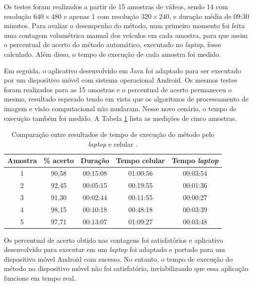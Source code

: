 Os testes foram realizados a partir de 15 amostras de vídeos, sendo 14 com resolução $640\times 480$ e apenas 1 com resolução $320\times 240$, e duração média de 09:30 minutos. Para avaliar o desempenho do método, num primeiro momento foi feita uma contagem volumétrica manual dos veículos em cada amostra, para que assim o percentual de acerto do método automático, executado no \textit{laptop}, fosse calculado. Além disso, o tempo de execução de cada amostra foi medido.

Em seguida, o aplicativo desenvolvido em Java foi adaptado para ser executado por um dispositivo móvel com sistema operacional Android. Os mesmos testes foram realizados para as 15 amostras e o percentual de acerto permaneceu o mesmo, resultado esperado tendo em vista que os algoritmos de processamento de imagem e visão computacional não mudaram. Nesse novo cenário, o tempo de execução também foi medido. A Tabela \ref{tab:feitosa} lista as medições de cinco amostras.


\begin{table}[ht]
  \caption{Comparação entre resultados de tempo de execução do método pelo \textit{laptop} e celular \citep{feitosa:2012:masther}.}
  \label{tab:feitosa}
  \begin{center}
    \begin{tabular}{ccccc}
    \toprule
    \textbf{Amostra} & \textbf{\% acerto} & \textbf{Duração} & \textbf{Tempo celular} & \textbf{Tempo \textit{laptop}}\\
    \midrule
      1 & 90,58 & 00:15:08 & 01:00:56 & 00:03:54\\
      2 & 92,45 & 00:05:15 & 00:19:55 & 00:01:36\\
      3 & 91,30 & 00:02:44 & 00:11:55 & 00:00:27\\
      4 & 98,15 & 00:10:18 & 00:48:18 & 00:03:39\\
      5 & 97,71 & 00:13:07 & 01:09:27 & 00:03:48\\
    \bottomrule
    \end{tabular}
  \end{center}
\end{table}

Os percentual de acerto obtido nas contagens foi satisfatórios e aplicativo desenvolvido para executar em um \textit{laptop} foi adaptado e portado para um dispositivo móvel Android com sucesso. No entanto, o tempo de execução do método no dispositivo móvel não foi satisfatório, inviabilizando que essa aplicação funcione em tempo real.


